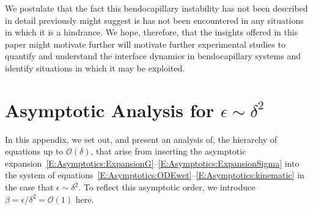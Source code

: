 \documentclass{jfm}
\newcommand{\order}[1]{\mathcal{O}\left(#1\right)}
\begin{document}
We postulate that the fact this bendocapillary instability has not been described in detail previously might suggest is has not been encountered in any situations in which it is a hindrance. We hope, therefore, that the insights offered in this paper might motivate further will motivate further experimental studies to quantify and understand the interface dynamics in bendocapillary systems and identify situations in which it may be exploited. 



\appendix
\section{Asymptotic Analysis for $\epsilon \sim \delta^2$}\label{A:SmallDeformationAsymptotics}
In this appendix, we set out, and present an analysis of, the hierarchy of equations up to $\order{\delta}$, that arise from inserting the asymptotic expansion~\eqref{E:Asymptotics:ExpansionG}--\eqref{E:Asymptotics:ExpansionSigma} into the system of equations~\eqref{E:Asymptotics:ODEwet}--\eqref{E:Asymptotics:kinematic} in the case that $\epsilon \sim \delta^2$. To reflect this asymptotic order, we introduce $\beta = \epsilon / \delta^2 = \order{1}$ here.
\end{document}
